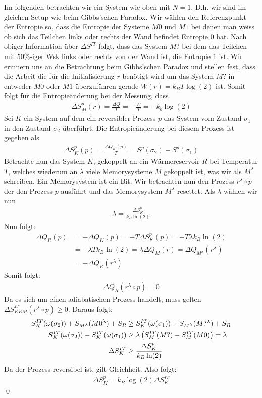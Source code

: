 Im folgenden betrachten wir ein System wie oben mit $N=1$. D.h. wir sind im
gleichen Setup wie beim Gibbs'schen Paradox. Wir wählen den Referenzpunkt
der Entropie so, dass die Entropie der Systeme $M0$ und $M1$ bei denen man weiss
ob sich das Teilchen links oder rechts der Wand befindet Entropie $0$ hat. Nach
obiger Information über $\Delta S^{IT}$ folgt, dass das System $M?$ bei dem das
Teilchen mit $50 \%$-iger Wsk links oder rechts von der Wand ist, die Entropie
$1$ ist. Wir erinnern uns an die Betrachtung beim Gibbs'schen Paradox und stellen
fest, dass die Arbeit die für die Initialisierung $r$ benötigt wird um das System
$M?$ in entweder $M0$ oder $M1$ überzuführen gerade $W(r) = k_B T \log(2)$ ist.
Somit folgt für die Entropieänderung bei der Messung, dass
\begin{align*}
    \Delta S_M^p (r) = \frac{\Delta Q}{T} = - \frac{W}{T} = - k_b \log(2)
\end{align*}
Sei $K$ ein System auf dem ein reversibler Prozess $p$ das System vom
Zustand $\sigma_1$ in den Zustand $\sigma_2$ überführt. Die Entropieänderung
bei diesem Prozess ist gegeben als
\begin{align*}
    \Delta S_K^p (p) = \frac{\Delta Q_K (p)}{T} = S^p (\sigma_2) - S^p (\sigma_1)
\end{align*}
Betrachte nun das
System $K$, gekoppelt an ein Wärmereservoir $R$ bei Temperatur $T$, welches
wiederum an $\lambda$ viele Memorysysteme $M$ gekoppelt ist, was wir als
$M^\lambda$ schreiben. Ein Memorysystem ist ein Bit. Wir betrachten nun den
Prozess $r^\lambda \circ p$ der den Prozess $p$ ausführt und das Memorysystem
$M^\lambda$ resettet. Als $\lambda$ wählen wir nun
\begin{align*}
    \lambda = \frac{\Delta S_K^p}{k_B \ln(2)}
\end{align*}
Nun folgt:
\begin{align*}
    \Delta Q_R (p)
    &= - \Delta Q_K (p)
    = - T \Delta S_K^p (p)
    = - T \lambda k_B \ln(2)
    \\
    &= - \lambda T k_B \ln(2)
    = \lambda \Delta Q_M (r)
    = \Delta Q_{M^\lambda} (r^\lambda)
    \\
    &= - \Delta Q_R (r^\lambda)
\end{align*}
Somit folgt:
\begin{align*}
    \Delta Q_R (r^\lambda \circ p) = 0
\end{align*}
Da es sich um einen adiabatischen Prozess handelt, muss gelten
$\Delta S_{KRM}^{IT} (r^\lambda \circ p) \geq 0$. Daraus folgt:
\begin{align*}
    S_K^{IT} (\omega(\sigma_2)) + S_{M^\lambda} (M0^\lambda) + S_R
    &\geq
    S_K^{IT} (\omega(\sigma_1)) + S_{M^\lambda} (M?^\lambda) + S_R
    \\
    S_K^{IT} (\omega(\sigma_2)) - S_K^{IT} (\omega(\sigma_1))
    &\geq
    \lambda \left( S_{M}^{IT} (M?) - S_{M}^{IT} (M0) \right) = \lambda
    \\
    \Delta S_K^{IT}
    &\geq \frac{\Delta S_K^p}{k_B \ln(2)}
\end{align*}
Da der Prozess reversibel ist, gilt Gleichheit. Also folgt:
\begin{align*}
    \Delta S_K^p = k_B \log(2) \Delta S_K^{IT}
\end{align*}
\qed

